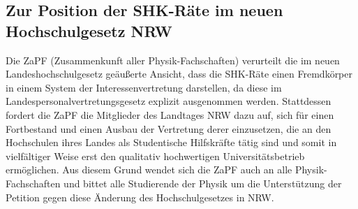 
\subsection{Zur Position der SHK-Räte im neuen Hochschulgesetz NRW}
Die ZaPF (Zusammenkunft aller Physik-Fachschaften) verurteilt die im neuen Landeshochschulgesetz
geäußerte Ansicht, dass die SHK-Räte einen Fremdkörper in einem System der Interessenvertretung darstellen, da diese im Landespersonalvertretungsgesetz explizit ausgenommen werden. Stattdessen fordert die ZaPF  die Mitglieder des Landtages
NRW dazu auf, sich für einen Fortbestand und einen Ausbau der Vertretung derer einzusetzen, die an den Hochschulen ihres
Landes als Studentische Hilfskräfte tätig sind und somit in vielfältiger Weise erst den qualitativ hochwertigen
Universitätsbetrieb ermöglichen. Aus diesem Grund wendet sich die ZaPF auch an alle Physik-Fachschaften und bittet alle
Studierende der Physik um die Unterstützung der Petition gegen diese Änderung des Hochschulgesetzes in NRW.
